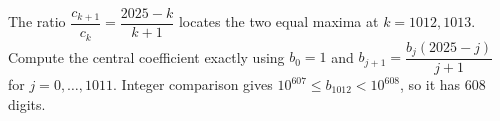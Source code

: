 The ratio $\dfrac{c_{k+1}}{c_k}=\dfrac{2025-k}{k+1}$ locates the two equal maxima at $k=1012,1013$. Compute the central coefficient exactly using $b_0=1$ and $b_{j+1}=\dfrac{b_j(2025-j)}{j+1}$ for $j=0,\ldots,1011$. Integer comparison gives $10^{607}\le b_{1012}<10^{608}$, so it has $\boxed{608}$ digits.
